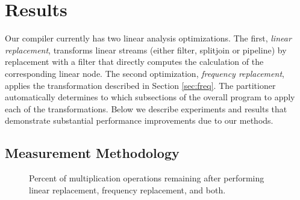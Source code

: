 \section{Results}
\label{sec:results}

Our compiler currently has two linear analysis optimizations. The
first, {\it linear replacement}, transforms linear streams 
(either filter, splitjoin or pipeline) by replacement with a filter 
that directly computes the calculation of the corresponding linear node. 
The second optimization, {\it frequency replacement}, applies the 
transformation described in Section \ref{sec:freq}. The partitioner 
automatically determines to which subsections of the overall program to apply
each of the transformations. Below we describe experiments and results 
that demonstrate substantial performance improvements due to our methods.

\subsection{Measurement Methodology}


\begin{figure}[t]
\center
\epsfxsize=3.2in
\vspace{-6pt}
\caption{Percent of multiplication operations remaining after performing linear replacement, frequency replacement, and both.}
\label{fig:linear-freq-both}
\vspace{-12pt}
\end{figure}

